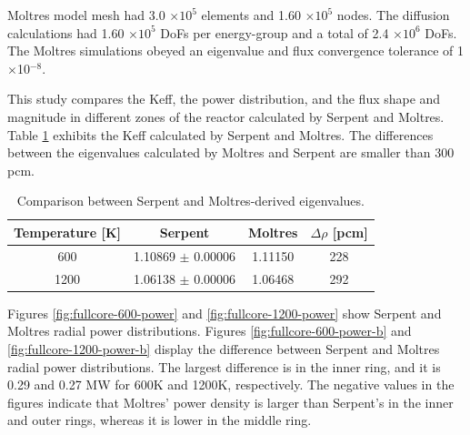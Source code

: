 Moltres model mesh had 3.0 $\times 10^5$ elements and 1.60 $\times 10^5$ nodes.
The diffusion calculations had 1.60 $\times 10^5$ \glspl{DoF} per energy-group and a total of 2.4 $\times 10^6$ DoFs.
The Moltres simulations obeyed an eigenvalue and flux convergence tolerance of 1$\times$10$^{-8}$.

This study compares the \gls{Keff}, the power distribution, and the flux shape and magnitude in different zones of the reactor calculated by Serpent and Moltres.
Table \ref{tab:full-keff} exhibits the \gls{Keff} calculated by Serpent and Moltres.
The differences between the eigenvalues calculated by Moltres and Serpent are smaller than 300 pcm.

\begin{table}[htbp!]
  \centering
  \caption{Comparison between Serpent and Moltres-derived eigenvalues.}
  \begin{tabular}{cccc}
  \toprule
  Temperature [K] & Serpent	& Moltres  & $\Delta \rho$ [pcm] 	\\
  \midrule
			 600  	    & 1.10869 $\pm$ 0.00006  & 1.11150	 &	228		\\
			1200 	      & 1.06138 $\pm$ 0.00006  & 1.06468	 &	292   \\
  \bottomrule
  \end{tabular}
  \label{tab:full-keff}
\end{table}

Figures \ref{fig:fullcore-600-power} and \ref{fig:fullcore-1200-power} show Serpent and Moltres radial power distributions.
Figures \ref{fig:fullcore-600-power-b} and \ref{fig:fullcore-1200-power-b} display the difference between Serpent and Moltres radial power distributions.
The largest difference is in the inner ring, and it is 0.29 and 0.27 MW for 600K and 1200K, respectively.
The negative values in the figures indicate that Moltres' power density is larger than Serpent's in the inner and outer rings, whereas it is lower in the middle ring.

